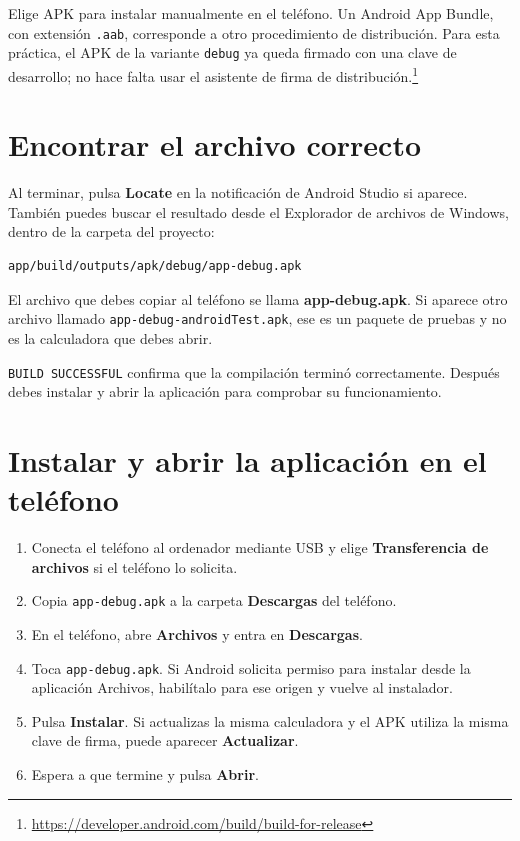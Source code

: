\documentclass[12pt,a4paper]{article}
\begin{document}
Elige APK para instalar manualmente en el teléfono. Un Android App Bundle, con extensión \texttt{.aab}, corresponde a otro procedimiento de distribución. Para esta práctica, el APK de la variante \texttt{debug} ya queda firmado con una clave de desarrollo; no hace falta usar el asistente de firma de distribución.\footnote{\url{https://developer.android.com/build/build-for-release}}

\section{Encontrar el archivo correcto}

Al terminar, pulsa \textbf{Locate} en la notificación de Android Studio si aparece. También puedes buscar el resultado desde el Explorador de archivos de Windows, dentro de la carpeta del proyecto:

\begin{verbatim}
app/build/outputs/apk/debug/app-debug.apk
\end{verbatim}

El archivo que debes copiar al teléfono se llama \textbf{app-debug.apk}. Si aparece otro archivo llamado \texttt{app-debug-androidTest.apk}, ese es un paquete de pruebas y no es la calculadora que debes abrir.

\texttt{BUILD SUCCESSFUL} confirma que la compilación terminó correctamente. Después debes instalar y abrir la aplicación para comprobar su funcionamiento.

\section{Instalar y abrir la aplicación en el teléfono}

\begin{enumerate}
    \item Conecta el teléfono al ordenador mediante USB y elige \textbf{Transferencia de archivos} si el teléfono lo solicita.
    \item Copia \texttt{app-debug.apk} a la carpeta \textbf{Descargas} del teléfono.
    \item En el teléfono, abre \textbf{Archivos} y entra en \textbf{Descargas}.
    \item Toca \texttt{app-debug.apk}. Si Android solicita permiso para instalar desde la aplicación Archivos, habilítalo para ese origen y vuelve al instalador.
    \item Pulsa \textbf{Instalar}. Si actualizas la misma calculadora y el APK utiliza la misma clave de firma, puede aparecer \textbf{Actualizar}.
    \item Espera a que termine y pulsa \textbf{Abrir}.
\end{enumerate}
\end{document}
